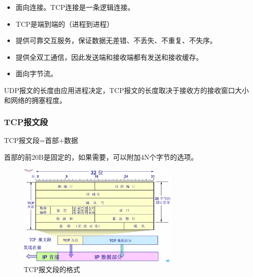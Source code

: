 \documentclass[12pt, a4paper, oneside]{ctexart}
\begin{document}
\begin{itemize}
    \item 面向连接。TCP连接是一条逻辑连接。
    \item TCP是端到端的（进程到进程）
    \item 提供可靠交互服务，保证数据无差错、不丢失、不重复、不失序。
    \item 提供全双工通信，因此发送端和接收端都有发送和接收缓存。
    \item 面向字节流。
\end{itemize}

UDP报文的长度由应用进程决定，TCP报文的长度取决于接收方的接收窗口大小和网络的拥塞程度。

\subsubsection{TCP报文段}

TCP报文段=首部+数据

首部的前20B是固定的，如果需要，可以附加4N个字节的选项。

\begin{figure}[h]
    \centering
    \includegraphics[width=0.7\textwidth]{./images/tcp_segment.png}
    \caption{TCP报文段的格式}
\end{figure}
\end{document}
